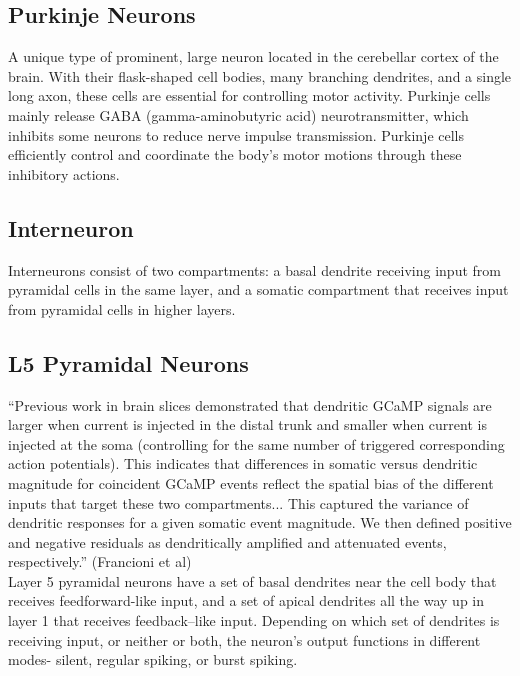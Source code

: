 \documentclass[11pt, a4paper]{article}
\begin{document}
\subsection{Purkinje Neurons}
A unique type of prominent, large neuron located in the cerebellar cortex of the brain. With their flask-shaped cell bodies, many branching dendrites, and a single long axon, these cells are essential for controlling motor activity. Purkinje cells mainly release GABA (gamma-aminobutyric acid) neurotransmitter, which inhibits some neurons to reduce nerve impulse transmission. Purkinje cells efficiently control and coordinate the body's motor motions through these inhibitory actions.

\subsection{Interneuron}
Interneurons consist of two compartments: a basal dendrite receiving input from pyramidal cells in the same layer, and a somatic compartment that receives input from pyramidal cells in higher layers.

\subsection{L5 Pyramidal Neurons} \label{sec:sdr}
``Previous work in brain slices demonstrated that dendritic GCaMP signals are larger when current is injected in the distal trunk and smaller when current is injected at the soma (controlling for the same number of triggered corresponding action potentials). This indicates that differences in somatic versus dendritic magnitude for coincident GCaMP events reflect the spatial bias of the different inputs that target these two compartments... This captured the variance of dendritic responses for a given somatic event magnitude. We then defined positive and negative residuals as dendritically amplified and attenuated events, respectively.'' (Francioni et al) \\

Layer 5 pyramidal neurons have a set of basal dendrites near the cell body that receives feedforward-like input, and a set of apical dendrites all the way up in layer 1 that receives feedback–like input. Depending on which set of dendrites is receiving input, or neither or both, the neuron’s output functions in different modes- silent, regular spiking, or burst spiking. \\
\end{document}
